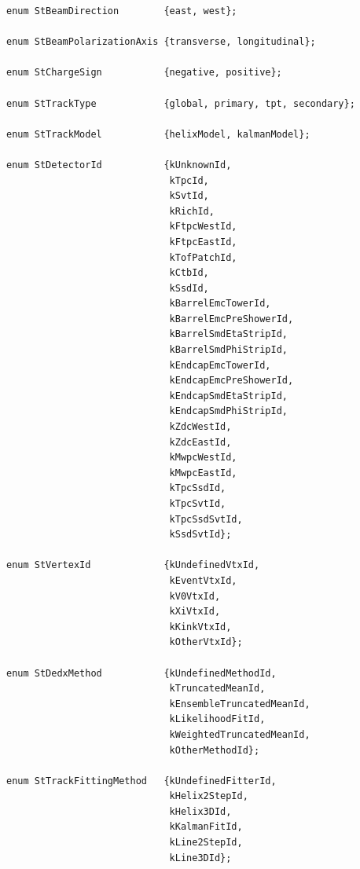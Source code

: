 \documentclass[twoside]{article}
\begin{document}
\begin{verbatim}
enum StBeamDirection        {east, west};

enum StBeamPolarizationAxis {transverse, longitudinal};

enum StChargeSign           {negative, positive};

enum StTrackType            {global, primary, tpt, secondary};

enum StTrackModel           {helixModel, kalmanModel};

enum StDetectorId           {kUnknownId,
                             kTpcId,
                             kSvtId,
                             kRichId,
                             kFtpcWestId,
                             kFtpcEastId,
                             kTofPatchId,
                             kCtbId,
                             kSsdId,
                             kBarrelEmcTowerId,
                             kBarrelEmcPreShowerId,
                             kBarrelSmdEtaStripId,
                             kBarrelSmdPhiStripId,
                             kEndcapEmcTowerId,
                             kEndcapEmcPreShowerId,
                             kEndcapSmdEtaStripId,
                             kEndcapSmdPhiStripId,
                             kZdcWestId,
                             kZdcEastId,
                             kMwpcWestId,
                             kMwpcEastId,
                             kTpcSsdId,
                             kTpcSvtId,
                             kTpcSsdSvtId,
                             kSsdSvtId};

enum StVertexId             {kUndefinedVtxId,
                             kEventVtxId,
                             kV0VtxId,
                             kXiVtxId,
                             kKinkVtxId,
                             kOtherVtxId};

enum StDedxMethod           {kUndefinedMethodId,
                             kTruncatedMeanId,
                             kEnsembleTruncatedMeanId,
                             kLikelihoodFitId,
                             kWeightedTruncatedMeanId,
                             kOtherMethodId};
           
enum StTrackFittingMethod   {kUndefinedFitterId,
                             kHelix2StepId,
                             kHelix3DId,
                             kKalmanFitId,
                             kLine2StepId,
                             kLine3DId};


\end{verbatim}
\end{document}
